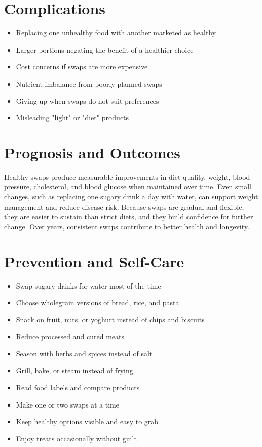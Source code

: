\section*{Complications}
\begin{itemize}
    \item Replacing one unhealthy food with another marketed as healthy
    \item Larger portions negating the benefit of a healthier choice
    \item Cost concerns if swaps are more expensive
    \item Nutrient imbalance from poorly planned swaps
    \item Giving up when swaps do not suit preferences
    \item Misleading "light" or "diet" products
\end{itemize}

\section*{Prognosis and Outcomes}
Healthy swaps produce measurable improvements in diet quality, weight, blood pressure, cholesterol, and blood glucose when maintained over time. Even small changes, such as replacing one sugary drink a day with water, can support weight management and reduce disease risk. Because swaps are gradual and flexible, they are easier to sustain than strict diets, and they build confidence for further change. Over years, consistent swaps contribute to better health and longevity.

\section*{Prevention and Self-Care}
\begin{itemize}
    \item Swap sugary drinks for water most of the time
    \item Choose wholegrain versions of bread, rice, and pasta
    \item Snack on fruit, nuts, or yoghurt instead of chips and biscuits
    \item Reduce processed and cured meats
    \item Season with herbs and spices instead of salt
    \item Grill, bake, or steam instead of frying
    \item Read food labels and compare products
    \item Make one or two swaps at a time
    \item Keep healthy options visible and easy to grab
    \item Enjoy treats occasionally without guilt
\end{itemize}

